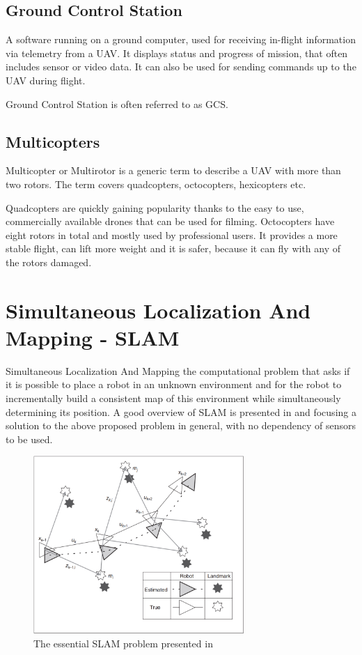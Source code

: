 \subsection{Ground Control Station}
A software running on a ground computer, used for receiving in-flight information via telemetry from a UAV.
It displays status and progress of mission, that often includes sensor or video data. It can also be used
for sending commands up to the UAV during flight.

Ground Control Station is often referred to as GCS.

\subsection{Multicopters}
Multicopter or Multirotor is a generic term to describe a UAV with more than two rotors. The term covers quadcopters,
octocopters, hexicopters etc.

Quadcopters are quickly gaining popularity thanks to the easy to use, commercially available drones that can be used
for filming. Octocopters have eight rotors in total and mostly used by professional users. It provides a more stable 
flight, can lift more weight and it is safer, because it can fly with any of the rotors damaged.

\section{Simultaneous Localization And Mapping - SLAM}
Simultaneous Localization And Mapping the computational problem that asks if it is possible to place a robot 
in an unknown environment and for the robot to incrementally build a consistent map of this environment while 
simultaneously determining its position. A good overview of SLAM is presented in\cite{durrant2006simultaneous} 
and \cite{diebel2006representing} focusing a solution to the above proposed problem in general, with no dependency 
of sensors to be used.

\begin{figure}[!ht]
    \centering
	\includegraphics[width=80mm, keepaspectratio]{figures/slam_tutorial_basic_figure.png}
    \caption{The essential SLAM problem presented in \cite{durrant2006simultaneous} }
    \label{fig:slam_tutorial_basic}
\end{figure}

